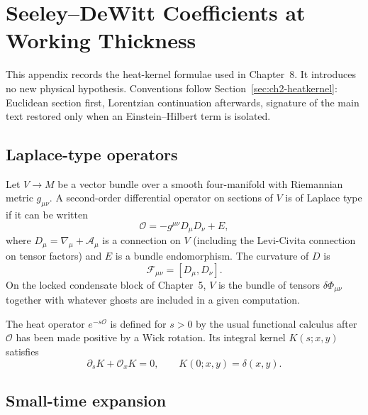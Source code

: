 \chapter{Seeley--DeWitt Coefficients at Working Thickness}
\label{app:seeley-dewitt}

This appendix records the heat-kernel formulae used in Chapter~8.
It introduces no new physical hypothesis. Conventions follow
Section~\ref{sec:ch2-heatkernel}: Euclidean section first,
Lorentzian continuation afterwards, signature of the main text
restored only when an Einstein--Hilbert term is isolated.

\section{Laplace-type operators}
\label{sec:appA-laplace}

Let \(V\to M\) be a vector bundle over a smooth four-manifold with
Riemannian metric \(g_{\mu\nu}\). A second-order differential
operator on sections of \(V\) is of Laplace type if it can be
written
\begin{equation}
  \label{eq:appA-O}
  \mathcal{O}
  =-g^{\mu\nu}D_\mu D_\nu+E,
\end{equation}
where \(D_\mu=\nabla_\mu+\mathcal{A}_\mu\) is a connection on \(V\)
(including the Levi-Civita connection on tensor factors) and \(E\)
is a bundle endomorphism. The curvature of \(D\) is
\begin{equation}
  \label{eq:appA-F}
  \mathcal{F}_{\mu\nu}
  =[D_\mu,D_\nu].
\end{equation}
On the locked condensate block of Chapter~5, \(V\) is the bundle of
tensors \(\delta\Phi_{\mu\nu}\) together with whatever ghosts are
included in a given computation.

The heat operator \(e^{-s\mathcal{O}}\) is defined for \(s>0\) by
the usual functional calculus after \(\mathcal{O}\) has been made
positive by a Wick rotation. Its integral kernel
\(K(s;x,y)\) satisfies
\begin{equation}
  \label{eq:appA-heat}
  \partial_s K+\mathcal{O}_x K=0,
  \qquad
  K(0;x,y)=\delta(x,y).
\end{equation}

\section{Small-time expansion}
\label{sec:appA-expand}

